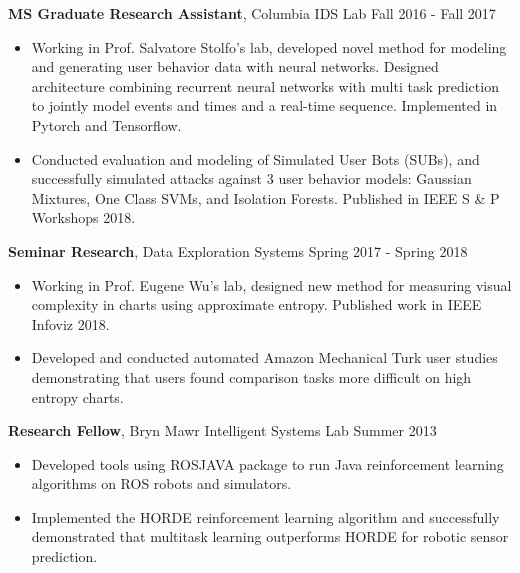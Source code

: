 \documentclass{article} %
\newcommand{\rjob}[2]{
  \hspace*{-0.3cm}
{\fontsize{10pt}{12pt}\selectfont #1} \hfill #2 
\vspace*{0.1cm} 
\hspace*{-1.2cm}
}
\newenvironment{ritemize}{
\hspace*{-0.8cm} 
\begin{minipage}{1.05\linewidth}
\begin{itemize}
}{
\end{itemize}
\end{minipage}
}
\newcommand{\ritem}{
\item[-]
}
\begin{document}
\rjob{\textbf{MS Graduate Research Assistant}, Columbia IDS Lab}{Fall 2016 - Fall 2017}\\
\begin{ritemize}
  \ritem Working in Prof. Salvatore Stolfo's lab, developed novel method for modeling and generating user behavior data with neural networks. Designed architecture combining recurrent neural networks with multi task prediction to jointly model events and times and a real-time sequence. Implemented in Pytorch and Tensorflow.
    \ritem Conducted evaluation and modeling of Simulated User Bots (SUBs), and successfully simulated attacks against 3 user behavior models: Gaussian Mixtures, One Class SVMs, and Isolation Forests. Published in IEEE S \& P Workshops 2018.
\end{ritemize}

\rjob{\textbf{Seminar Research}, Data Exploration Systems}{Spring 2017 - Spring 2018}\\
\begin{ritemize}
    \ritem Working in Prof. Eugene Wu's lab, designed new method for measuring visual complexity in charts using approximate entropy. Published work in IEEE Infoviz 2018.
  \ritem Developed and conducted automated Amazon Mechanical Turk user studies demonstrating that users found comparison tasks more difficult on high entropy charts.
\end{ritemize}


\rjob{\textbf{Research Fellow}, Bryn Mawr Intelligent Systems Lab}{Summer 2013}\\
\begin{ritemize}
\ritem Developed tools using ROSJAVA package to run Java reinforcement learning algorithms on ROS robots and simulators.
\ritem Implemented the HORDE reinforcement learning algorithm and successfully demonstrated that multitask learning outperforms HORDE for robotic sensor prediction.
\end{ritemize}
\end{document}
